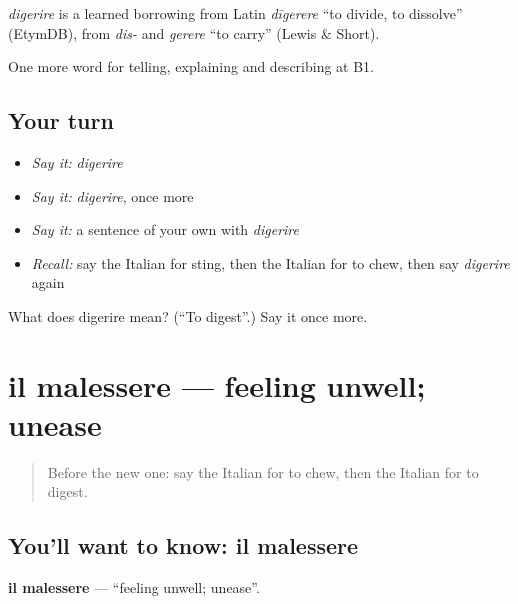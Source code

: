 \begin{cousinweb}
\emph{digerire} is a learned borrowing from Latin \emph{dīgerere} \textquotedblleft{}to divide, to dissolve\textquotedblright{} (EtymDB), from \emph{dis-} and \emph{gerere} \textquotedblleft{}to carry\textquotedblright{} (Lewis \& Short).
\end{cousinweb}

\begin{grammarlens}[title={What you've built}]
One more word for telling, explaining and describing at B1.
\end{grammarlens}

\subsection*{Your turn}
\begin{itemize}
\raggedright
  \item \emph{Say it:} \emph{digerire}
  \item \emph{Say it:} \emph{digerire}, once more
  \item \emph{Say it:} a sentence of your own with \emph{digerire}
  \item \emph{Recall:} say the Italian for sting, then the Italian for to chew, then say \emph{digerire} again
\end{itemize}

\begin{tcolorbox}[breakable,colback=teal!4,colframe=teal!35!black,title={Before you move on}]
What does digerire mean? (\textquotedblleft{}To digest\textquotedblright{}.) Say it once more.
\end{tcolorbox}
\section[il malessere]{il malessere — feeling unwell; unease}

\label{lesson:IT-C487-malessere}



\begin{quote}
Before the new one: say the Italian for to chew, then the Italian for to digest.
\end{quote}

\subsection*{You'll want to know: il malessere}
\textbf{il malessere} — \textquotedblleft{}feeling unwell; unease\textquotedblright{}.

